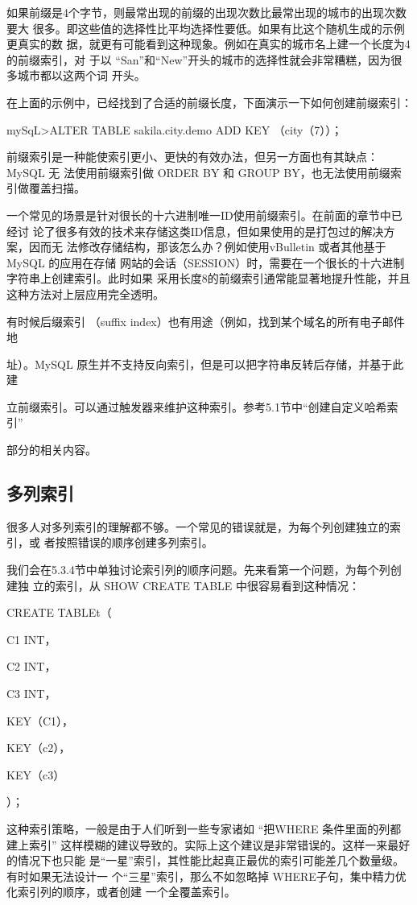 如果前缀是4个字节，则最常出现的前缀的出现次数比最常出现的城市的出现次数要大
很多。即这些值的选择性比平均选择性要低。如果有比这个随机生成的示例更真实的数
据，就更有可能看到这种现象。例如在真实的城市名上建一个长度为4的前缀索引，对
于以 “San”和“New”开头的城市的选择性就会非常糟糕，因为很多城市都以这两个词
开头。

在上面的示例中，已经找到了合适的前缀长度，下面演示一下如何创建前缀索引：

mySqL>ALTER TABLE sakila.city.demo ADD KEY （city（7））；

前缀索引是一种能使索引更小、更快的有效办法，但另一方面也有其缺点：MySQL 无
法使用前缀索引做 ORDER BY 和 GROUP BY，也无法使用前缀索引做覆盖扫描。

一个常见的场景是针对很长的十六进制唯一ID使用前缀索引。在前面的章节中已经讨
论了很多有效的技术来存储这类ID信息，但如果使用的是打包过的解决方案，因而无
法修改存储结构，那该怎么办？例如使用vBulletin 或者其他基于 MySQL 的应用在存储
网站的会话（SESSION）时，需要在一个很长的十六进制字符串上创建索引。此时如果
采用长度8的前缀索引通常能显著地提升性能，并且这种方法对上层应用完全透明。

有时候后缀索引 （suffix index）也有用途（例如，找到某个域名的所有电子邮件地

址）。MySQL 原生并不支持反向索引，但是可以把字符串反转后存储，并基于此建

立前缀索引。可以通过触发器来维护这种索引。参考5.1节中“创建自定义哈希索引”

部分的相关内容。

\subsection{多列索引}
很多人对多列索引的理解都不够。一个常见的错误就是，为每个列创建独立的索引，或
者按照错误的顺序创建多列索引。

我们会在5.3.4节中单独讨论索引列的顺序问题。先来看第一个问题，为每个列创建独
立的索引，从 SHOW CREATE TABLE 中很容易看到这种情况：

CREATE TABLEt（

C1 INT，

C2 INT，

C3 INT，

KEY（C1），

KEY（c2），

KEY（c3）

）；

这种索引策略，一般是由于人们听到一些专家诸如 “把WHERE 条件里面的列都建上索引”
这样模糊的建议导致的。实际上这个建议是非常错误的。这样一来最好的情况下也只能
是“一星”索引，其性能比起真正最优的索引可能差几个数量级。有时如果无法设计一
个“三星”索引，那么不如忽略掉 WHERE子句，集中精力优化索引列的顺序，或者创建
一个全覆盖索引。

